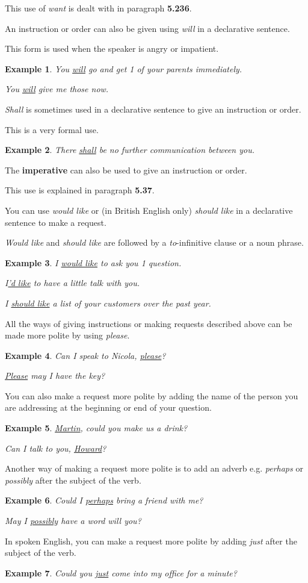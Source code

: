 \documentclass[oneside]{book}
\numberwithin{equation}{section}
\newtheorem{example}{Example}[section]
\begin{document}
This use of \textit{want} is dealt with in paragraph \textbf{5.236}.

%
\noindent{} An instruction or order can also be given using \textit{will} in a declarative sentence.

This form is used when the speaker is angry or impatient.
\begin{example}
    You \underline{will} go and get 1 of your parents immediately.
    
    You \underline{will} give me those now.
\end{example}
%
\noindent{} \textit{Shall} is sometimes used in a declarative sentence to give an instruction or order.

This is a very formal use.
\begin{example}
    There \underline{shall} be no further communication between you.
\end{example}
%
\noindent{} The \textbf{imperative} can also be used to give an instruction or order.

This use is explained in paragraph \textbf{5.37}.

%
\noindent{} You can use \textit{would like} or (in British English only) \textit{should like} in a declarative sentence to make a request.

\textit{Would like} and \textit{should like} are followed by a \textit{to}-infinitive clause or a noun phrase.
\begin{example}
    I \underline{would like} to ask you 1 question.
    
    I\underline{'d like} to have a little talk with you.
    
    I \underline{should like} a list of your customers over the past year.
\end{example}
%
\noindent{} All the ways of giving instructions or making requests described above can be made more polite by using \textit{please}.
\begin{example}
    Can I speak to Nicola, \underline{please}?
    
    \underline{Please} may I have the key?
\end{example}
You can also make a request more polite by adding the name of the person you are addressing at the beginning or end of your question.
\begin{example}
    \underline{Martin}, could you make us a drink?
    
    Can I talk to you, \underline{Howard}?
\end{example}
Another way of making a request more polite is to add an adverb e.g. \textit{perhaps} or \textit{possibly} after the subject of the verb.
\begin{example}
    Could I \underline{perhaps} bring a friend with me?
    
    May I \underline{possibly} have a word will you?
\end{example}
In spoken English, you can make a request more polite by adding \textit{just} after the subject of the verb.
\begin{example}
    Could you \underline{just} come into my office for a minute?
\end{example}
\end{document}
